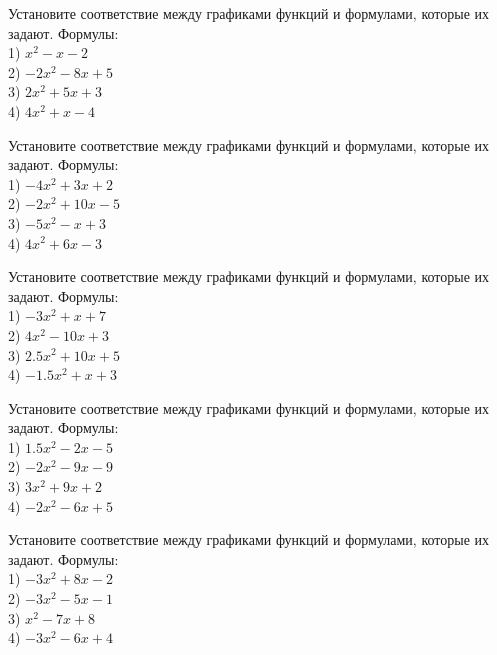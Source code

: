 \documentclass[4apaper]{article}
\begin{document}
\begin{taskBN}{27}
Установите соответствие между графиками функций и формулами, которые их задают. Формулы: \\1) $x^2-x-2$\\2) $-2x^2-8x+5$\\3) $2x^2+5x+3$\\4) $4x^2+x-4$
\end{taskBN}

\begin{taskBN}{28}
Установите соответствие между графиками функций и формулами, которые их задают. Формулы: \\1) $-4x^2+3x+2$\\2) $-2x^2+10x-5$\\3) $-5x^2-x+3$\\4) $4x^2+6x-3$
\end{taskBN}

\begin{taskBN}{29}
Установите соответствие между графиками функций и формулами, которые их задают. Формулы: \\1) $-3x^2+x+7$\\2) $4x^2-10x+3$\\3) $2.5x^2+10x+5$\\4) $-1.5x^2+x+3$
\end{taskBN}

\begin{taskBN}{30}
Установите соответствие между графиками функций и формулами, которые их задают. Формулы: \\1) $1.5x^2-2x-5$\\2) $-2x^2-9x-9$\\3) $3x^2+9x+2$\\4) $-2x^2-6x+5$
\end{taskBN}

\begin{taskBN}{31}
Установите соответствие между графиками функций и формулами, которые их задают. Формулы: \\1) $-3x^2+8x-2$\\2) $-3x^2-5x-1$\\3) $x^2-7x+8$\\4) $-3x^2-6x+4$
\end{taskBN}
\end{document}
